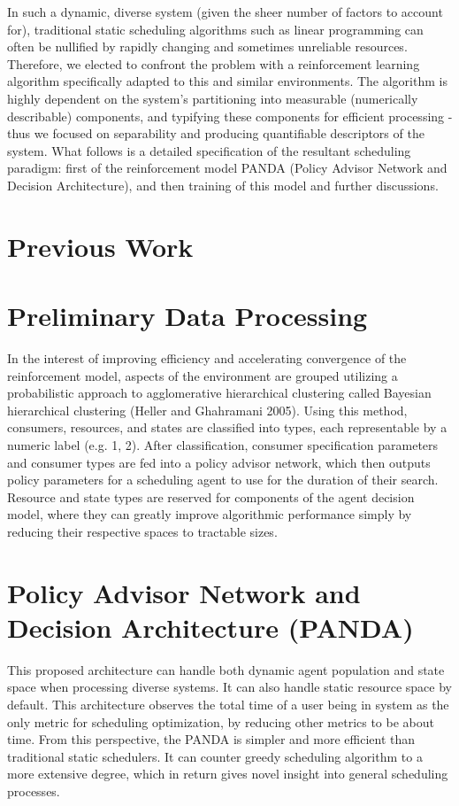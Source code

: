 \documentclass{article}
\theoremstyle{definition}
\theoremstyle{remark}
\begin{document}
	In such a dynamic, diverse system (given the sheer number of factors to account	for), traditional static scheduling algorithms such as linear programming can often be nullified by rapidly changing and sometimes unreliable resources. Therefore, we elected to confront the problem with a reinforcement learning algorithm specifically adapted to this and similar environments. The algorithm is highly dependent on the system's partitioning into measurable (numerically describable) components, and typifying these components for efficient processing - thus we focused on separability and producing quantifiable descriptors of the system. What follows is a detailed specification of the resultant scheduling paradigm: first of the reinforcement model PANDA (Policy Advisor Network and Decision Architecture), and then training of this model and further discussions.


	\section{Previous Work}
	
	\section{Preliminary Data Processing}
	
	In the interest of improving efficiency and accelerating convergence of the reinforcement model, aspects of the environment are grouped utilizing a probabilistic approach to agglomerative hierarchical clustering called Bayesian hierarchical clustering (Heller and Ghahramani 2005). Using this method, consumers, resources, and states are classified into types, each representable by a numeric label (e.g. 1, 2). After classification, consumer specification parameters and consumer types are fed into a policy advisor network, which then outputs policy parameters for a scheduling agent to use for the duration of their search. Resource and state types are reserved for components of the agent decision model, where they can greatly improve algorithmic performance simply by reducing their respective spaces to tractable sizes.

	\section{Policy Advisor Network and Decision Architecture (PANDA)}

	This proposed architecture can handle both dynamic agent population and state space when processing diverse systems. It can also handle static resource space by default. This architecture observes the total time of a user being in system as the only metric for scheduling optimization, by reducing other metrics to be about time. From this perspective, the PANDA is simpler and more efficient than traditional static schedulers. It can counter greedy scheduling algorithm to a more extensive degree, which in return gives novel insight into general scheduling processes.
\end{document}
